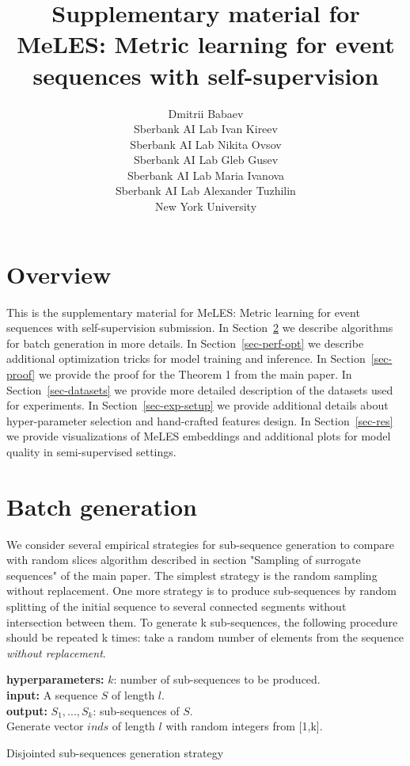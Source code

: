 \documentclass{article}
\title{Supplementary material for MeLES: Metric learning for event sequences with self-supervision}
\author{
Dmitrii Babaev \\
Sberbank AI Lab
\And
Ivan Kireev \\
Sberbank AI Lab
\And
Nikita Ovsov \\
Sberbank AI Lab
\And
Gleb Gusev \\
Sberbank AI Lab
\And
Maria Ivanova \\
Sberbank AI Lab
\And
Alexander Tuzhilin \\
New York University
}
\begin{document}
\maketitle

\section{Overview}

This is the supplementary material for MeLES: Metric learning for event sequences with self-supervision submission. In Section~\ref{sec-bg} we describe algorithms for batch generation in more details. In Section~\ref{sec-perf-opt} we describe additional optimization tricks for model training and inference. In Section~\ref{sec-proof} we provide the proof for the Theorem 1 from the main paper. In Section~\ref{sec-datasets} we provide more detailed description of the datasets used for experiments. In Section~\ref{sec-exp-setup} we provide additional details about hyper-parameter selection and hand-crafted features design. In Section~\ref{sec-res} we provide visualizations of MeLES embeddings and additional plots for model quality in semi-supervised settings.

\section{Batch generation} \label{sec-bg}

We consider several empirical strategies for sub-sequence generation to compare with random slices algorithm described in section "Sampling of surrogate sequences" of the main paper.
The simplest strategy is the random sampling without replacement.
One more strategy is to produce sub-sequences by random splitting of the initial sequence to several connected segments without intersection between them. To generate k sub-sequences, the following procedure should be repeated k times: take a random number of elements from the sequence \textit{without replacement}.

\begin{algorithm}
\SetAlgoLined
\textbf{hyperparameters:} $k$: number of sub-sequences to be produced. \\
\textbf{input:} A sequence $S$ of length $l$. \\
\textbf{output:} $S_1,...,S_k$: sub-sequences of $S$. \\

\BlankLine
Generate vector $inds$ of length $l$ with random integers from [1,k].\\
\caption{Disjointed sub-sequences generation strategy}
\label{alg-disj-ss}

\end{algorithm}
\end{document}
